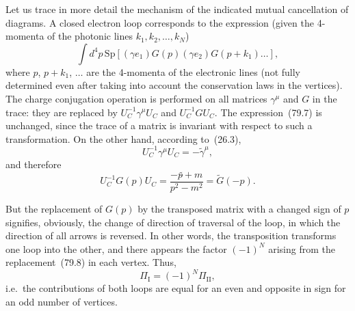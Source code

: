 Let us trace in more detail the mechanism of the indicated mutual cancellation of diagrams. A closed electron loop corresponds to the expression (given the 4-momenta of the photonic lines $k_1, k_2, \ldots, k_N$)
\begin{equation}
\int d^4p\,\mathrm{Sp}[(\gamma e_1)G(p)(\gamma e_2)G(p + k_1)\ldots],
\tag{79.7}
\end{equation}
where $p$, $p + k_1$, $\ldots$ are the 4-momenta of the electronic lines (not fully determined even after taking into account the conservation laws in the vertices). The charge conjugation operation is performed on all matrices $\gamma^\mu$ and $G$ in the trace: they are replaced by $U_C^{-1}\gamma^\mu U_C$ and $U_C^{-1}G U_C$. The expression~(79.7) is unchanged, since the trace of a matrix is invariant with respect to such a transformation. On the other hand, according to~(26.3),
\begin{equation}
U_C^{-1}\gamma^\mu U_C = -\widetilde{\gamma}^\mu,
\tag{79.8}
\end{equation}
and therefore
\begin{equation}
U_C^{-1}G(p)U_C = \frac{-p\widetilde{\hat{}} + m}{p^2 - m^2} = \widetilde{G}(-p).
\tag{79.9}
\end{equation}

But the replacement of $G(p)$ by the transposed matrix with a changed sign of $p$ signifies, obviously, the change of direction of traversal of the loop, in which the direction of all arrows is reversed. In other words, the transposition transforms one loop into the other, and there appears the factor $(-1)^N$ arising from the replacement~(79.8) in each vertex. Thus,
\begin{equation}
\Pi_\mathrm{I} = (-1)^N\Pi_\mathrm{II},
\tag{79.10}
\end{equation}
i.e.\ the contributions of both loops are equal for an even and opposite in sign for an odd number of vertices.
